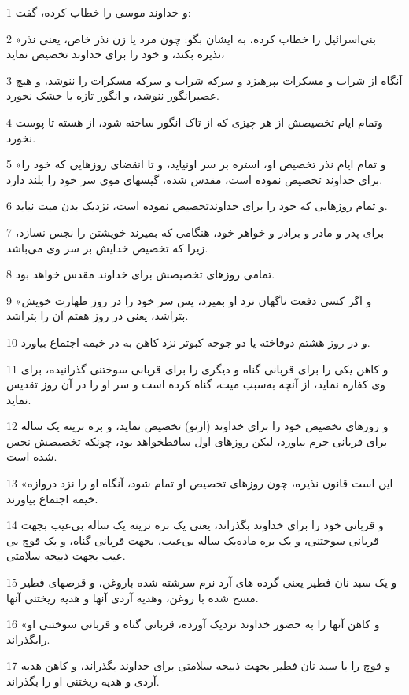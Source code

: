\par 1 و خداوند موسی را خطاب کرده، گفت:
\par 2 «بنی‌اسرائیل را خطاب کرده، به ایشان بگو: چون مرد یا زن نذر خاص، یعنی نذر نذیره بکند، و خود را برای خداوند تخصیص نماید،
\par 3 آنگاه از شراب و مسکرات بپرهیزد و سرکه شراب و سرکه مسکرات را ننوشد، و هیچ عصیرانگور ننوشد، و انگور تازه یا خشک نخورد.
\par 4 وتمام ایام تخصیصش از هر چیزی که از تاک انگور ساخته شود، از هسته تا پوست نخورد.
\par 5 «و تمام ایام نذر تخصیص او، استره بر سر اونیاید، و تا انقضای روزهایی که خود را برای خداوند تخصیص نموده است، مقدس شده، گیسهای موی سر خود را بلند دارد.
\par 6 و تمام روزهایی که خود را برای خداوندتخصیص نموده است، نزدیک بدن میت نیاید.
\par 7 برای پدر و مادر و برادر و خواهر خود، هنگامی که بمیرند خویشتن را نجس نسازد، زیرا که تخصیص خدایش بر سر وی می‌باشد.
\par 8 تمامی روزهای تخصیصش برای خداوند مقدس خواهد بود.
\par 9 «و اگر کسی دفعت ناگهان نزد او بمیرد، پس سر خود را در روز طهارت خویش بتراشد، یعنی در روز هفتم آن را بتراشد.
\par 10 و در روز هشتم دوفاخته یا دو جوجه کبوتر نزد کاهن به در خیمه اجتماع بیاورد.
\par 11 و کاهن یکی را برای قربانی گناه و دیگری را برای قربانی سوختنی گذرانیده، برای وی کفاره نماید، از آنچه به‌سبب میت، گناه کرده است و سر او را در آن روز تقدیس نماید.
\par 12 و روزهای تخصیص خود را برای خداوند (ازنو) تخصیص نماید، و بره نرینه یک ساله برای قربانی جرم بیاورد، لیکن روزهای اول ساقطخواهد بود، چونکه تخصیصش نجس شده است.
\par 13 «این است قانون نذیره، چون روزهای تخصیص او تمام شود، آنگاه او را نزد دروازه خیمه اجتماع بیاورند.
\par 14 و قربانی خود را برای خداوند بگذراند، یعنی یک بره نرینه یک ساله بی‌عیب بجهت قربانی سوختنی، و یک بره ماده‌یک ساله بی‌عیب، بجهت قربانی گناه، و یک قوچ بی عیب بجهت ذبیحه سلامتی.
\par 15 و یک سبد نان فطیر یعنی گرده های آرد نرم سرشته شده باروغن، و قرصهای فطیر مسح شده با روغن، وهدیه آردی آنها و هدیه ریختنی آنها.
\par 16 «و کاهن آنها را به حضور خداوند نزدیک آورده، قربانی گناه و قربانی سوختنی او رابگذراند.
\par 17 و قوچ را با سبد نان فطیر بجهت ذبیحه سلامتی برای خداوند بگذراند، و کاهن هدیه آردی و هدیه ریختنی او را بگذراند.
